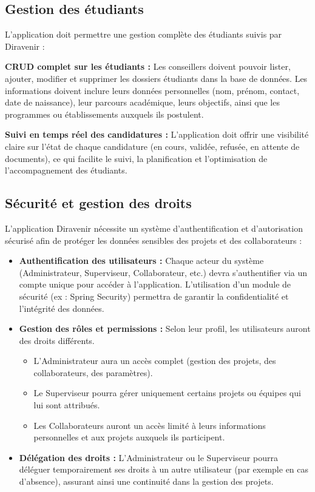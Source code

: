 \documentclass[12pt,a4paper]{report}
\begin{document}
\subsection{Gestion des étudiants}

L'application doit permettre une gestion complète des étudiants suivis par Diravenir :

\textbf{CRUD complet sur les étudiants :}
Les conseillers doivent pouvoir lister, ajouter, modifier et supprimer les dossiers étudiants dans la base de données. Les informations doivent inclure leurs données personnelles (nom, prénom, contact, date de naissance), leur parcours académique, leurs objectifs, ainsi que les programmes ou établissements auxquels ils postulent.

\textbf{Suivi en temps réel des candidatures :}
L'application doit offrir une visibilité claire sur l'état de chaque candidature (en cours, validée, refusée, en attente de documents), ce qui facilite le suivi, la planification et l'optimisation de l'accompagnement des étudiants.

\subsection{Sécurité et gestion des droits}

L'application Diravenir nécessite un système d'authentification et d'autorisation sécurisé afin de protéger les données sensibles des projets et des collaborateurs :

\begin{itemize}
    \item \textbf{Authentification des utilisateurs :}
    Chaque acteur du système (Administrateur, Superviseur, Collaborateur, etc.) devra s'authentifier via un compte unique pour accéder à l'application. L'utilisation d'un module de sécurité (ex : Spring Security) permettra de garantir la confidentialité et l'intégrité des données.
    
    \item \textbf{Gestion des rôles et permissions :}
    Selon leur profil, les utilisateurs auront des droits différents.
    \begin{itemize}
        \item L'Administrateur aura un accès complet (gestion des projets, des collaborateurs, des paramètres).
        \item Le Superviseur pourra gérer uniquement certains projets ou équipes qui lui sont attribués.
        \item Les Collaborateurs auront un accès limité à leurs informations personnelles et aux projets auxquels ils participent.
    \end{itemize}
    
    \item \textbf{Délégation des droits :}
    L'Administrateur ou le Superviseur pourra déléguer temporairement ses droits à un autre utilisateur (par exemple en cas d'absence), assurant ainsi une continuité dans la gestion des projets.
\end{itemize}
\end{document}
